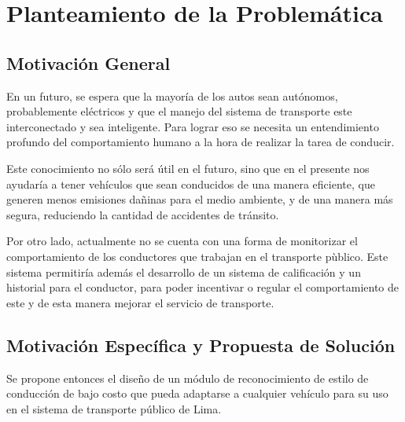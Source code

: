 
\chapter{Planteamiento de la Problemática}  %

\ifpdf
    \graphicspath{{Chapter1/Figs/Raster/}{Chapter1/Figs/PDF/}{Chapter1/Figs/}}
\else
    \graphicspath{{Chapter1/Figs/Vector/}{Chapter1/Figs/}}
\fi


\section{Motivación General}

En un futuro, se espera que la mayoría de los autos sean autónomos, probablemente eléctricos y que el manejo del sistema de transporte este interconectado y sea inteligente. Para lograr eso se necesita un entendimiento profundo del comportamiento humano a la hora de realizar la tarea de conducir.

Este conocimiento no sólo será útil en el futuro, sino que en el presente nos ayudaría a tener vehículos que sean conducidos de una manera eficiente, que generen menos emisiones dañinas para el medio ambiente, y de una manera más segura, reduciendo la cantidad de accidentes de tránsito.

Por otro lado, actualmente no se cuenta con una forma de monitorizar el comportamiento de los conductores que trabajan en el transporte pùblico. Este sistema permitiría además el desarrollo de un sistema de calificación y un historial para el conductor, para poder incentivar o regular el comportamiento de este y de esta manera mejorar el servicio de transporte.


\section{Motivación Específica y Propuesta de Solución}

Se propone entonces el diseño de un módulo de reconocimiento de estilo de conducción de bajo costo que pueda adaptarse a cualquier vehículo para su uso en el sistema de transporte público de Lima.

